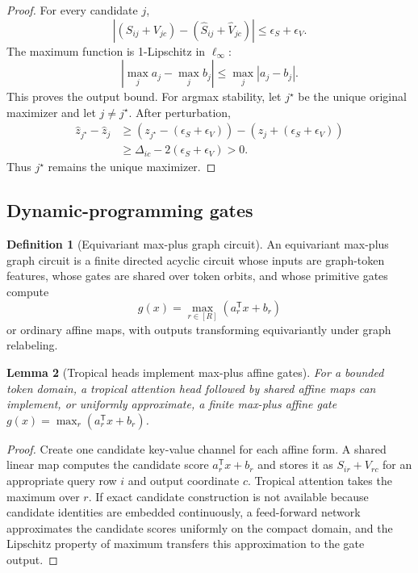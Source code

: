 \documentclass[11pt]{article}
\theoremstyle{definition}
\newtheorem{definition}{Definition}[section]
\theoremstyle{plain}
\newtheorem{lemma}[definition]{Lemma}
\theoremstyle{remark}
\numberwithin{equation}{section}
\newcommand{\abs}[1]{\left\lvert #1\right\rvert}
\newcommand{\transpose}{^{\mathsf T}}
\begin{document}
\begin{proof}
For every candidate $j$,
\begin{equation}
  \abs{(S_{ij}+V_{jc})-(\widehat S_{ij}+\widehat V_{jc})}\le\epsilon_S+
\epsilon_V.
\end{equation}
The maximum function is 1-Lipschitz in $\ell_\infty$:
\begin{equation}
  \abs{\max_j a_j-\max_j b_j}\le\max_j\abs{a_j-b_j}.
\end{equation}
This proves the output bound.  For argmax stability, let $j^\star$ be the unique original maximizer and let $j\ne j^\star$.  After perturbation,
\begin{align}
  \widehat z_{j^\star}-\widehat z_j
  &\ge (z_{j^\star}-(\epsilon_S+\epsilon_V))-(z_j+(\epsilon_S+\epsilon_V))\\
  &\ge \Delta_{ic}-2(\epsilon_S+\epsilon_V)>0.
\end{align}
Thus $j^\star$ remains the unique maximizer.
\end{proof}

\subsection{Dynamic-programming gates}

\begin{definition}[Equivariant max-plus graph circuit]
An equivariant max-plus graph circuit is a finite directed acyclic circuit whose inputs are graph-token features, whose gates are shared over token orbits, and whose primitive gates compute
\begin{equation}
  g(x)=\max_{r\in[R]}(a_r\transpose x+b_r)
\end{equation}
or ordinary affine maps, with outputs transforming equivariantly under graph relabeling.
\end{definition}

\begin{lemma}[Tropical heads implement max-plus affine gates]
For a bounded token domain, a tropical attention head followed by shared affine maps can implement, or uniformly approximate, a finite max-plus affine gate $g(x)=\max_r(a_r\transpose x+b_r)$.
\end{lemma}

\begin{proof}
Create one candidate key-value channel for each affine form.  A shared linear map computes the candidate score $a_r\transpose x+b_r$ and stores it as $S_{ir}+V_{rc}$ for an appropriate query row $i$ and output coordinate $c$.  Tropical attention takes the maximum over $r$.  If exact candidate construction is not available because candidate identities are embedded continuously, a feed-forward network approximates the candidate scores uniformly on the compact domain, and the Lipschitz property of maximum transfers this approximation to the gate output.
\end{proof}
\end{document}
